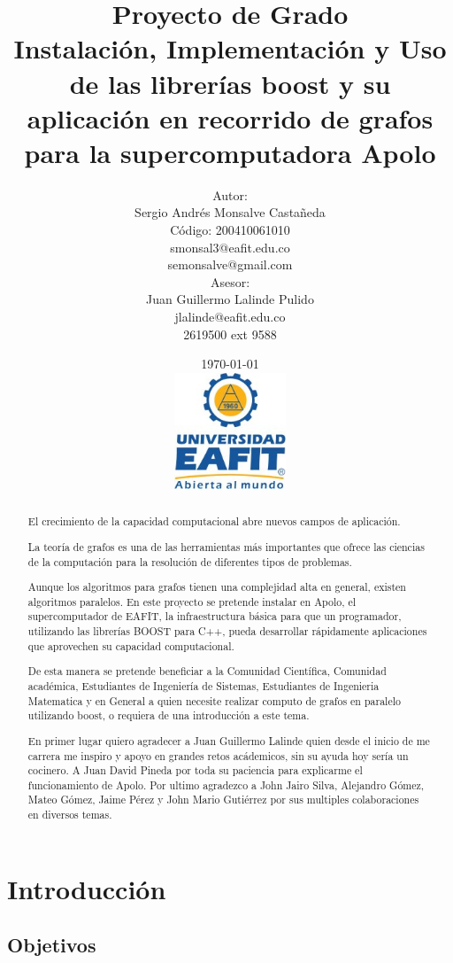 \documentclass[twoside,letterpaper,12pt]{report}
\title{
Proyecto de Grado\\[0.5cm]
Instalación, Implementación y Uso de las librerías boost y su aplicación en recorrido de grafos para la supercomputadora Apolo}
\author{
	Autor:\\[0.3cm]
	Sergio Andrés Monsalve Castañeda\\
	Código: 200410061010\\
	smonsal3@eafit.edu.co\\
	semonsalve@gmail.com\\[0.7cm]
	Asesor: \\[0.3cm]
	Juan Guillermo Lalinde Pulido\\
	jlalinde@eafit.edu.co\\
	2619500 ext 9588%
}
\date{
	\today \\[0.5cm]
	\includegraphics[width=0.25\textwidth]{aux/logo_eafit}
}
\begin{document}
\maketitle

\tableofcontents


\begin{abstract}

El crecimiento de la capacidad computacional abre nuevos campos de aplicación. 

La teoría de grafos es una de las herramientas más importantes que ofrece las ciencias de la computación para la resolución de diferentes tipos de problemas. 

Aunque los algoritmos para grafos tienen una complejidad alta en general, existen algoritmos paralelos. En este proyecto se pretende instalar en Apolo, el supercomputador de EAFIT, la infraestructura básica para que un programador, utilizando las librerías BOOST para C++, pueda desarrollar rápidamente aplicaciones que aprovechen su capacidad computacional. 

De esta manera se pretende beneficiar a la Comunidad Científica, Comunidad académica, Estudiantes de Ingeniería de Sistemas, Estudiantes de Ingenieria Matematica y en General a quien necesite realizar computo de grafos en paralelo utilizando boost, o requiera de una introducción a este tema.


\end{abstract}

\newpage

\renewcommand{\abstractname}{Agradecimientos}
\begin{abstract}

En primer lugar quiero agradecer a Juan Guillermo Lalinde quien desde el inicio de me carrera me inspiro y apoyo en grandes retos acádemicos, sin su ayuda hoy sería un cocinero. A Juan David Pineda por toda su paciencia para explicarme el funcionamiento de Apolo. Por ultimo agradezco a John Jairo Silva, Alejandro Gómez, Mateo Gómez, Jaime Pérez y John Mario Gutiérrez por sus multiples colaboraciones en diversos temas. 

\end{abstract}

\newpage

\chapter{Introducción}

\section{Objetivos}
\end{document}

